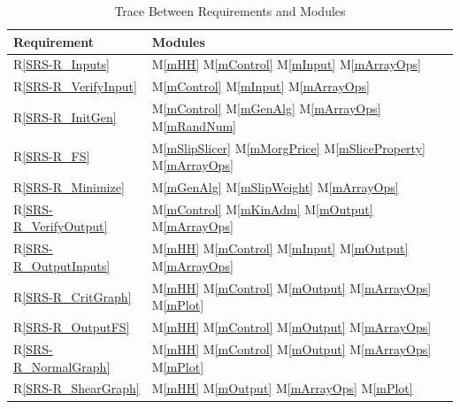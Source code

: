 \documentclass[12pt, titlepage]{article}
\newcommand{\rref}[1]{R\ref{#1}}
\newcommand{\mref}[1]{M\ref{#1}}
\begin{document}
\begin{table}[h!]
\centering
\begin{tabular}{ll}
\toprule
\textbf{Requirement} & \textbf{Modules}\\
\midrule
\rref{SRS-R_Inputs} & \mref{mHH} \mref{mControl} \mref{mInput} 
\mref{mArrayOps}\\
\rref{SRS-R_VerifyInput} & \mref{mControl} \mref{mInput} \mref{mArrayOps}\\
\rref{SRS-R_InitGen} & \mref{mControl} \mref{mGenAlg} \mref{mArrayOps} 
\mref{mRandNum} \\
\rref{SRS-R_FS} & \mref{mSlipSlicer} \mref{mMorgPrice} \mref{mSliceProperty} 
\mref{mArrayOps}\\
\rref{SRS-R_Minimize} & \mref{mGenAlg} \mref{mSlipWeight} \mref{mArrayOps}\\
\rref{SRS-R_VerifyOutput} & \mref{mControl} \mref{mKinAdm} \mref{mOutput} 
\mref{mArrayOps}\\
\rref{SRS-R_OutputInputs} & \mref{mHH} \mref{mControl} \mref{mInput} 
\mref{mOutput} \mref{mArrayOps}\\
\rref{SRS-R_CritGraph} & \mref{mHH} \mref{mControl} \mref{mOutput} 
\mref{mArrayOps} \mref{mPlot}\\
\rref{SRS-R_OutputFS} & \mref{mHH} \mref{mControl} \mref{mOutput} 
\mref{mArrayOps}\\
\rref{SRS-R_NormalGraph} & \mref{mHH} \mref{mControl} \mref{mOutput} 
\mref{mArrayOps} \mref{mPlot}\\
\rref{SRS-R_ShearGraph} & \mref{mHH} \mref{mOutput} \mref{mArrayOps} 
\mref{mPlot}\\
\bottomrule
\end{tabular}
\caption{Trace Between Requirements and Modules}
\label{Table:Req}
\end{table}
\end{document}
